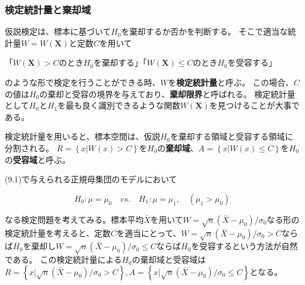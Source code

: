 \documentclass{article}
\begin{document}
\subsubsection{検定統計量と棄却域}

仮説検定は、標本に基づいて$H_0$を棄却するか否かを判断する。
そこで適当な統計量$W=W(\bm{X})$と定数$C$を用いて

「$W(\bm{X})>C$のとき$H_0$を棄却する」「$W(\bm{X}) \leq C$のとき$H_0$を受容する」

のような形で検定を行うことができる時、$W$を\textbf{検定統計量}と呼ぶ。
この場合、$C$の値は$H_0$の棄却と受容の境界を与えており、\textbf{棄却限界}と呼ばれる。
検定統計量として$H_0$と$H_1$を最も良く識別できるような関数$W(\bm{X})$を見つけることが大事である。

検定統計量を用いると、標本空間は、仮説$H_0$を棄却する領域と受容する領域に分割される。
$R=\left\{x|W(x)>C\right\}$を$H_0$の\textbf{棄却域}、$A=\left\{x|W(x) \leq C\right\}$を$H_0$の\textbf{受容域}と呼ぶ。

(9.1)で与えられる正規母集団のモデルにおいて

$$
H_0: \mu = \mu_0 \quad vs. \quad H_1: \mu = \mu_1,\quad (\mu_1 > \mu_0)
$$

なる検定問題を考えてみる。標本平均$\bar{X}$を用いて$W=\sqrt{n}(\bar{X}-\mu_0)/\sigma_0$なる形の検定統計量を考えると、定数$C$を適当にとって、$W=\sqrt{n}(\bar{X}-\mu_0)/\sigma_0>C$ならば$H_0$を棄却し$W=\sqrt{n}(\bar{X}-\mu_0)/\sigma_0\leq C$ならば$H_0$を受容するという方法が自然である。
この検定統計量による$H_0$の棄却域と受容域は$R=\left\{x|\sqrt{n}(\bar{X}-\mu_0)/\sigma_0>C\right\}, A=\left\{x|\sqrt{n}(\bar{X}-\mu_0)/\sigma_0 \leq C\right\} $となる。
\end{document}
